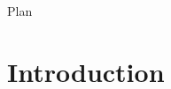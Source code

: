\documentclass{beamer}
\title{}
\author[ENS ulm]{}
\date{Janvier 2014}
\begin{document}
\begin{frame}
  \titlepage
\end{frame}

\begin{frame}{Plan}
  \tableofcontents
\end{frame}

\section{Introduction}
\end{document}

